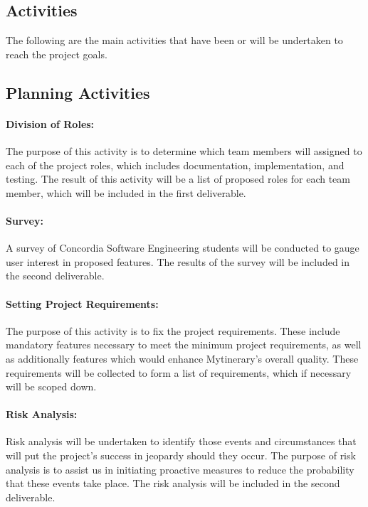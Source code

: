 \documentclass[12pt]{article}
\begin{document}
\subsection{Activities}
The following are the main activities that have been or will be undertaken to reach
the project goals.

\subsection*{Planning Activities}
\paragraph*{Division of Roles:}The purpose of this activity is to determine which team members will assigned to each of the project roles, which includes documentation, implementation, and testing. The result of this activity will be a list of proposed roles for each team member, which will be included in the first deliverable.

\paragraph*{Survey:}A survey of Concordia Software Engineering students will be conducted to gauge user interest in proposed features. The results of the survey will be included in the second deliverable.

\paragraph*{Setting Project Requirements:}The purpose of this activity is to fix the project requirements. These include mandatory features necessary to meet the minimum project requirements, as well as additionally features which would enhance Mytinerary's overall quality. These requirements will be collected to form a list of requirements, which if necessary will be scoped down.

\paragraph*{Risk Analysis:}Risk analysis will be undertaken to identify those events and circumstances that will put the project's success in jeopardy should they occur. The purpose of risk analysis is to assist us in initiating proactive measures to reduce the probability that these events take place. The risk analysis will be included in the second deliverable.
\end{document}

